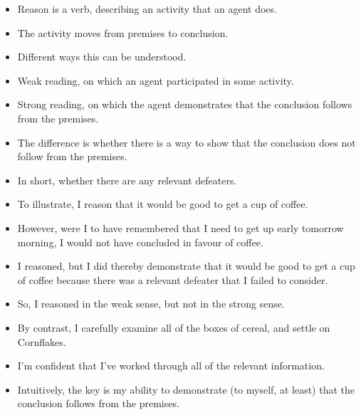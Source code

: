 \documentclass[10pt]{article}
\begin{document}
\begin{itemize}
\item Reason is a verb, describing an activity that an agent does.
\item The activity moves from premises to conclusion.
\item Different ways this can be understood.
\item Weak reading, on which an agent participated in some activity.
\item Strong reading, on which the agent demonstrates that the conclusion follows from the premises.
\item The difference is whether there is a way to show that the conclusion does not follow from the premises.
\item In short, whether there are any relevant defeaters.
\item To illustrate, I reason that it would be good to get a cup of coffee.
\item However, were I to have remembered that I need to get up early tomorrow morning, I would not have concluded in favour of coffee.
\item I reasoned, but I did thereby demonstrate that it would be good to get a cup of coffee because there was a relevant defeater that I failed to consider.
\item So, I reasoned in the weak sense, but not in the strong sense.
\item By contrast, I carefully examine all of the boxes of cereal, and settle on Cornflakes.
\item I'm confident that I've worked through all of the relevant information.
\item Intuitively, the key is my ability to demonstrate (to myself, at least) that the conclusion follows from the premises.
\end{itemize}
\end{document}
